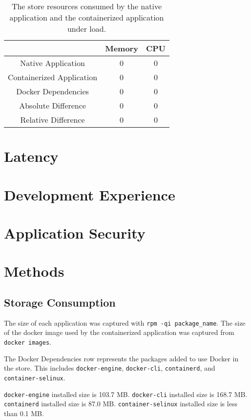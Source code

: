 \documentclass{article}
\begin{document}
\begin{table}[h!]
\begin{tabular}{ |c|c|c| }
 \hline
   & Memory & CPU \\ 
 \hline
 Native Application & 0 & 0\\
 \hline
 Containerized Application & 0 & 0 \\
 \hline
 Docker Dependencies & 0 & 0 \\
 \hline\hline
 Absolute Difference & 0 & 0 \\
 \hline
 Relative Difference & 0 & 0 \\
 \hline
\end{tabular}
\caption{The store resources consumed by the native application and the containerized application under load.}
\label{table:2}
\end{table}

\section{Latency}

\section{Development Experience}

\section{Application Security}

\section{Methods}
\subsection{Storage Consumption}
The size of each application was captured with \texttt{rpm -qi package\_name}. The size of the docker image used by the containerized application was captured from \texttt{docker images}.

The Docker Dependencies row represents the packages added to use Docker in the store. This includes \texttt{docker-engine}, \texttt{docker-cli}, \texttt{containerd}, and \texttt{container-selinux}.

\texttt{docker-engine} installed size is 103.7 MB. \texttt{docker-cli} installed size is 168.7 MB. \texttt{containerd} installed size is 87.0 MB. \texttt{container-selinux} installed size is less than 0.1 MB.
\end{document}
